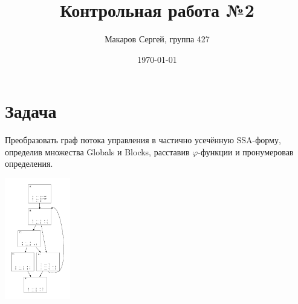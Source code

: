 \documentclass[11pt]{article}
\author{Макаров Сергей, группа 427}
\date{\today}
\title{Контрольная работа №2}
\begin{document}
\maketitle

\section{Задача}
\label{sec:org428aa37}
Преобразовать граф потока управления в частично усечённую SSA-форму, определив множества Globals и Blocks, расставив \(\varphi\)-функции и пронумеровав определения.
\begin{center}
\includegraphics[height=200px]{./cfg.png}
\end{center}
\end{document}

